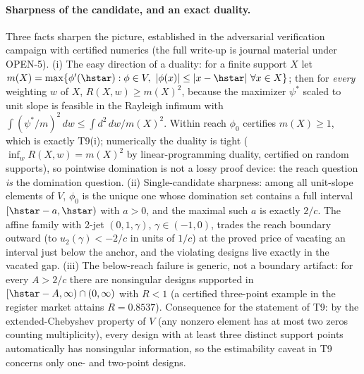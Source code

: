 \paragraph{Sharpness of the candidate, and an exact duality.}
Three facts sharpen the picture, established in the adversarial
verification campaign with certified numerics (the full write-up is
journal material under OPEN-5). (i) The easy direction of a duality: for
a finite support $X$ let
$m(X) = \max\{\phi'(\hstar) : \phi \in V,\ |\phi(x)| \le |x - \hstar|
\ \forall x \in X\}$; then for \emph{every} weighting $w$ of $X$,
$R(X, w) \ge m(X)^2$, because the maximizer $\psi^*$ scaled to unit slope
is feasible in the Rayleigh infimum with
$\int (\psi^*/m)^2\, dw \le \int d^2\, dw / m(X)^2$. Within reach
$\phi_0$ certifies $m(X) \ge 1$, which is exactly T9(i); numerically the
duality is tight ($\inf_w R(X, w) = m(X)^2$ by linear-programming
duality, certified on random supports), so pointwise domination is not a
lossy proof device: the reach question \emph{is} the domination question.
(ii) Single-candidate sharpness: among all unit-slope elements of $V$,
$\phi_0$ is the unique one whose domination set contains a full interval
$[\hstar - a, \hstar)$ with $a > 0$, and the maximal such $a$ is exactly
$2/c$. The affine family with 2-jet $(0, 1, \gamma)$, $\gamma \in (-1, 0)$,
trades the reach boundary outward (to $u_2(\gamma) < -2/c$ in units of
$1/c$) at the proved price of vacating an interval just below the anchor,
and the violating designs live exactly in the vacated gap. (iii) The
below-reach failure is generic, not a boundary artifact: for every
$A > 2/c$ there are nonsingular designs supported in
$[\hstar - A, \infty) \cap (0, \infty)$ with $R < 1$ (a certified
three-point example in the register market attains $R = 0.8537$).
Consequence for the statement of T9: by the extended-Chebyshev property
of $V$ (any nonzero element has at most two zeros counting multiplicity),
every design with at least three distinct support points automatically
has nonsingular information, so the estimability caveat in T9 concerns
only one- and two-point designs.

